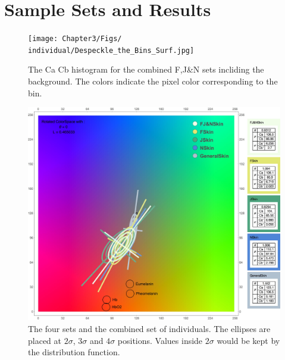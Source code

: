 \section{Sample Sets and Results}\label{sec:SampleSets}

\begin{figure}[h!]
  \centering
    \texttt{[image: Chapter3/Figs/\\individual/Despeckle\_the\_Bins\_Surf.jpg]}
        \caption{The Ca Cb histogram for the combined F,J\&N sets incliding the background. The colors indicate the pixel color corresponding to the bin. }  \label{fig:Despeckle_the_Bins_Surf}
    \end{figure}

\begin{figure}[h!]
  \centering
    \includegraphics[width=\textwidth]{Chapter3/Figs/All_Together_2D.jpg}
    \caption{The four sets and the combined set of individuals. The ellipses are placed at $2\sigma$, $3\sigma$ and $4\sigma$ positions. Values inside $2\sigma$ would be kept by the distribution function.}  \label{fig:AllTogether2D}
\end{figure}


